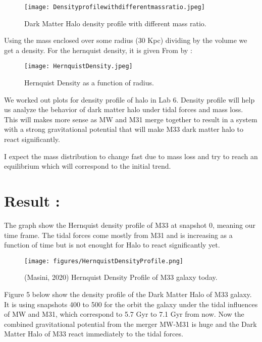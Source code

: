 \documentclass{aastex63}
\begin{document}
\begin{figure}[h]
    \centering
    \texttt{[image: Densityprofilewithdifferentmassratio.jpeg]}
    \caption{\cite{Conroy11} Dark Matter Halo density profile with different mass ratio.}
    \label{fig:galaxy}
\end{figure}

\vspace{0.5mm}

Using the mass enclosed over some radius (30 Kpc)  dividing by the volume we get a density. For the hernquist density, it is given From \cite{Hern90} by :

\begin{figure}[h]
    \centering
    \texttt{[image: HernquistDensity.jpeg]}
    \caption{\cite{Hern90} Hernquist Density as a function of radius.}
    \label{fig:galaxy}
\end{figure}

We worked out plots for density profile of halo in Lab 6. Density profile will help us analyze the behavior of dark matter halo under tidal forces and mass loss. This will makes more sense as MW and M31 merge together to result in a system with a strong gravitational potential that will make M33 dark matter halo to react significantly.

\vspace{0.5mm}    

I expect the mass distribution to change fast due to mass loss and try to reach an equilibrium which will correspond to the initial trend.



\section{Result :}


The graph show the Hernquist density profile of M33 at snapshot 0, meaning our time frame. The tidal forces come mostly from M31 and is increasing as a function of time but is not enought for Halo to react significantly yet.

\begin{figure}[h]
    \centering
    \texttt{[image: figures/HernquistDensityProfile.png]}
    \caption{(Masini, 2020) Hernquist Density Profile of M33 galaxy today.}
    \label{fig:galaxy}
\end{figure}


Figure 5 below show the density profile of the Dark Matter Halo of M33 galaxy. It is using snapshots 400 to 500 for the orbit the galaxy under the tidal influences of MW and M31, which correspond to 5.7 Gyr to 7.1 Gyr from now. Now the combined gravitational potential from the merger MW-M31 is huge and the Dark Matter Halo of M33 react immediately to the tidal forces.
\end{document}
